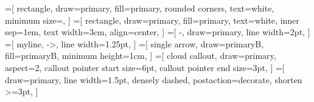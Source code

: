 %
%
%
=[
  rectangle,
  draw=primary,
  fill=primary,
  rounded corners,
  text=white,
  minimum size=,
]
=[
  rectangle,
  draw=primary,
  fill=primary,
  text=white,
  inner sep=1em,
  text width=3cm,
  align=center,
]
=[
  -,
  draw=primary,
  line width=2pt,
]
=[
  myline,
  ->,
  line width=1.25pt,
]
=[
  single arrow,
  draw=primaryB,
  fill=primaryB,
  minimum height=1cm,
]
=[
  cloud callout,
  draw=primary,
  aspect=2,
  callout pointer start size=6pt,
  callout pointer end size=3pt,
]
=[
  draw=primary,
  line width=1.5pt,
  densely dashed,
  postaction={decorate},
  shorten >=3pt,
]
%
%